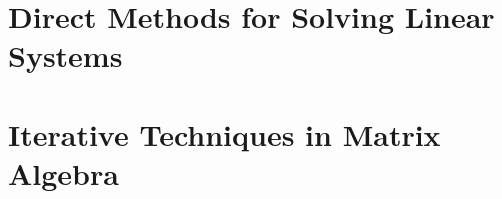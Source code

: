 \documentclass[openany]{ctexbook}
\begin{document}
\chapter{Direct Methods for Solving Linear Systems}
  
  

\chapter{Iterative Techniques in Matrix Algebra}
  
  
  

\end{document}

